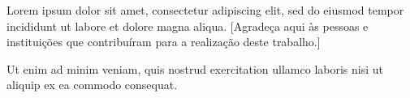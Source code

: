 
Lorem ipsum dolor sit amet, consectetur adipiscing elit, sed do eiusmod tempor
incididunt ut labore et dolore magna aliqua. [Agradeça aqui às pessoas e
instituições que contribuíram para a realização deste trabalho.]

Ut enim ad minim veniam, quis nostrud exercitation ullamco laboris nisi ut
aliquip ex ea commodo consequat.

